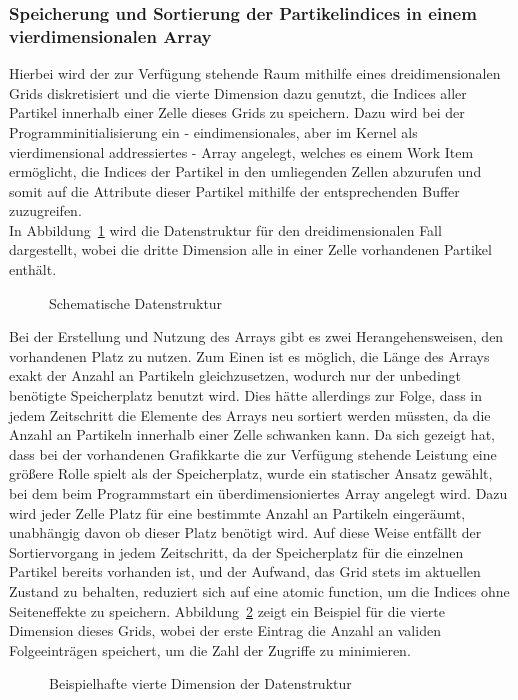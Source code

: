 \subsubsection{Speicherung und Sortierung der Partikelindices in einem vierdimensionalen Array}
Hierbei wird der zur Verfügung stehende Raum mithilfe eines dreidimensionalen Grids diskretisiert und die vierte Dimension dazu genutzt, die Indices aller Partikel innerhalb einer Zelle dieses Grids zu speichern. Dazu wird bei der Programminitialisierung ein - eindimensionales, aber im Kernel als vierdimensional addressiertes - Array angelegt, welches es einem Work Item ermöglicht, die Indices der Partikel in den umliegenden Zellen abzurufen und somit auf die Attribute dieser Partikel mithilfe der entsprechenden Buffer zuzugreifen.\\
In Abbildung~\ref{fig:datenstruktur_grid} wird die Datenstruktur für den dreidimensionalen Fall dargestellt, wobei die dritte Dimension alle in einer Zelle vorhandenen Partikel enthält.\\
\begin{figure}
  \centering
    
  \caption{Schematische Datenstruktur}
  \label{fig:datenstruktur_grid}
\end{figure}
Bei der Erstellung und Nutzung des Arrays gibt es zwei Herangehensweisen, den vorhandenen Platz zu nutzen. Zum Einen ist es möglich, die Länge des Arrays exakt der Anzahl an Partikeln gleichzusetzen, wodurch nur der unbedingt benötigte Speicherplatz benutzt wird. Dies hätte allerdings zur Folge, dass in jedem Zeitschritt die Elemente des Arrays neu sortiert werden müssten, da die Anzahl an Partikeln innerhalb einer Zelle schwanken kann. Da sich gezeigt hat, dass bei der vorhandenen Grafikkarte die zur Verfügung stehende Leistung eine größere Rolle spielt als der Speicherplatz, wurde ein statischer Ansatz gewählt, bei dem beim Programmstart ein überdimensioniertes Array angelegt wird. Dazu wird jeder Zelle Platz für eine bestimmte Anzahl an Partikeln eingeräumt, unabhängig davon ob dieser Platz benötigt wird. Auf diese Weise entfällt der Sortiervorgang in jedem Zeitschritt, da der Speicherplatz für die einzelnen Partikel bereits vorhanden ist, und der Aufwand, das Grid stets im aktuellen Zustand zu behalten, reduziert sich auf eine atomic function, um die Indices ohne Seiteneffekte zu speichern. Abbildung~\ref{fig:datenstruktur_eintraege} zeigt ein Beispiel für die vierte Dimension dieses Grids, wobei der erste Eintrag die Anzahl an validen Folgeeinträgen speichert, um die Zahl der Zugriffe zu minimieren.
\begin{figure}
  \centering
    
  \caption{Beispielhafte vierte Dimension der Datenstruktur}
  \label{fig:datenstruktur_eintraege}
\end{figure}

